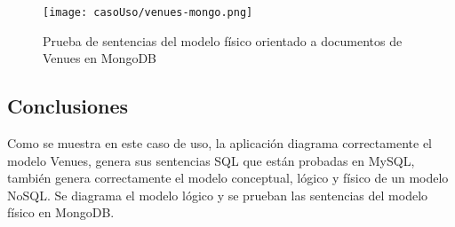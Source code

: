 \begin{figure}[H]
    \centering
    \texttt{[image: casoUso/venues-mongo.png]}
    \caption{Prueba de sentencias del modelo físico orientado a documentos de Venues en MongoDB}
    \label{img:venues-mongo}
\end{figure}

\subsection{Conclusiones}
Como se muestra en este caso de uso, la aplicación diagrama correctamente el modelo Venues, genera sus sentencias SQL que están probadas en MySQL, también genera correctamente el modelo conceptual, lógico y físico de un modelo NoSQL. Se diagrama el modelo lógico y se prueban las sentencias del modelo físico en MongoDB.

